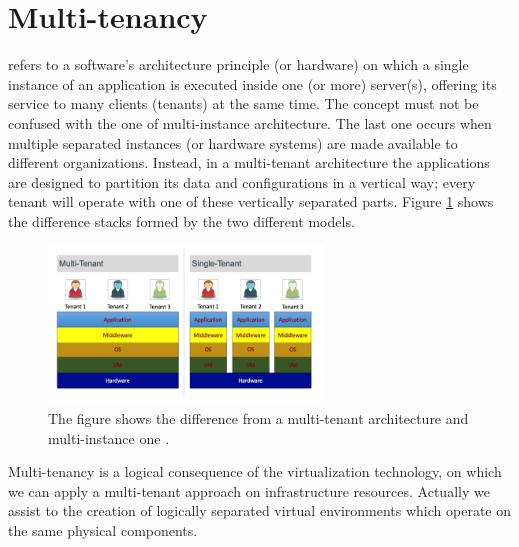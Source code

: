 %
%
\section{Multi-tenancy}
\label{sec:elasticity-multiTenancy}
 refers to a software's architecture principle (or hardware) on which a single instance
of an application is executed inside one (or more) server(s), offering its service to many clients (tenants)
at the same time. The concept must not be confused with the one of multi-instance architecture. The last one
occurs when multiple separated instances (or hardware systems) are made available to different
organizations. Instead, in a multi-tenant architecture the applications are designed to partition 
its data and configurations in a vertical way; every tenant will operate with one of these vertically separated
parts. Figure \ref{img:elasticity-multiTenancy-difference} shows the difference stacks formed by the two
different models.

\begin{figure}
	\centering{}
	\includegraphics[width=0.65\textwidth]{chapters/elasticity/images/multi-tenancy.png}
	\caption[Multi-teanancy and multi-instance architecture]{The figure shows the difference from a multi-tenant
		architecture and multi-instance one \cite{multiTenancyAnymore}.}
	\label{img:elasticity-multiTenancy-difference}
\end{figure}

Multi-tenancy is a logical consequence of the virtualization technology, on which we can apply a multi-tenant
approach on infrastructure resources. Actually we assist to the creation of logically separated virtual environments
which operate on the same physical components. 

